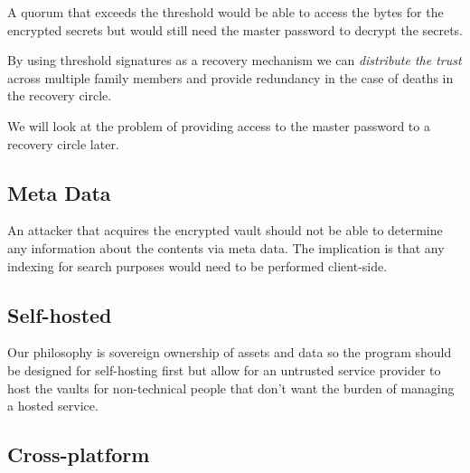 \documentclass[a4paper,titlepage,oneside]{article}
\renewcommand{\paragraph}{\small}
\begin{document}
\paragraph{A quorum that exceeds the threshold would be able to access the bytes for the encrypted secrets but would still need the master password to decrypt the secrets.}

\paragraph{By using threshold signatures as a recovery mechanism we can \emph{distribute the trust} across multiple family members and provide redundancy in the case of deaths in the recovery circle.}

\paragraph{We will look at the problem of providing access to the master password to a recovery circle later.}

\subsection{Meta Data}

\paragraph{An attacker that acquires the encrypted vault should not be able to determine any information about the contents via meta data. The implication is that any indexing for search purposes would need to be performed client-side.}

\subsection{Self-hosted}

\paragraph{Our philosophy is sovereign ownership of assets and data so the program should be designed for self-hosting first but allow for an untrusted service provider to host the vaults for non-technical people that don't want the burden of managing a hosted service.}

\subsection{Cross-platform}
\end{document}
